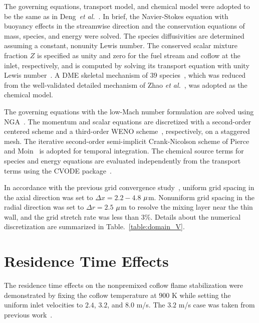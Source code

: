 \documentclass[review,3p,times]{elsarticle}
\begin{document}
The governing equations, transport model, and chemical model were adopted to be the same as in Deng~\emph{et al.}~\cite{deng15}.  In brief, the Navier-Stokes equation with buoyancy effects in the streamwise direction and the conservation equations of mass, species, and energy were solved.  The species diffusivities are determined assuming a constant, nonunity Lewis number.  The conserved scalar mixture fraction $Z$ is specified as unity and zero for the fuel stream and coflow at the inlet, respectively, and is computed by solving its transport equation with unity Lewis number~\cite{pitsch98b}.  A DME skeletal mechanism of $39$ species~\cite{bhagatwala15}, which was reduced from the well-validated detailed mechanism of Zhao \emph{et al.}~\cite{zhao08}, was adopted as the chemical model.

The governing equations with the low-Mach number formulation are solved using NGA~\cite{desjardins08}.  The momentum and scalar equations are discretized with a second-order centered scheme and a third-order WENO scheme~\cite{liu94}, respectively, on a staggered mesh.  The iterative second-order semi-implicit Crank-Nicolson scheme of Pierce and Moin~\cite{pierce01} is adopted for temporal integration.  The chemical source terms for species and energy equations are evaluated independently from the transport terms using the CVODE package~\cite{cohen96}.

In accordance with the previous grid convergence study~\cite{deng15}, uniform grid spacing in the axial direction was set to $\Delta x = 2.2-4.8$ ${\rm \mu}$m.  Nonuniform grid spacing in the radial direction was set to $\Delta r = 2.5$ ${\rm \mu}$m to resolve the mixing layer near the thin wall, and the grid stretch rate was less than $3$\%.  Details about the numerical discretization are summarized in Table.~\ref{table:domain_V}.      


\section{Residence Time Effects}

The residence time effects on the nonpremixed coflow flame stabilization were demonstrated by fixing the coflow temperature at $900$ K while setting the uniform inlet velocities to $2.4$, $3.2$, and $8.0$ m/s.  The $3.2$ m/s case was taken from previous work~\cite{deng15}.  
\end{document}
